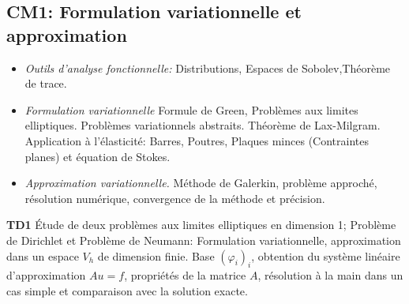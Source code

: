 \documentclass{article}
\begin{document}
\subsection*{CM1: Formulation variationnelle et approximation}
\begin{itemize}[label=\textbullet, font=\small \color{greenESTP}]
\item {\em Outils d'analyse fonctionnelle: } Distributions, Espaces de Sobolev,Théorème de trace.
\item {\em Formulation variationnelle} Formule de Green, Problèmes aux limites elliptiques. Problèmes variationnels abstraits. Théorème de Lax-Milgram. Application à l'élasticité: Barres, Poutres, Plaques minces (Contraintes planes) et équation de Stokes.
\item {\em Approximation variationnelle.} Méthode de Galerkin, problème approché, résolution numérique, convergence de la méthode et précision.
\end{itemize}
{\bf TD1} Étude de deux problèmes aux limites elliptiques en dimension 1; Problème de Dirichlet et Problème de Neumann: Formulation variationnelle, approximation dans un espace $V_h$ de dimension finie. Base $(\varphi_i)_i$, obtention du système linéaire d'approximation $Au=f$, propriétés de la matrice $A$, résolution à la main dans un cas simple et comparaison avec la solution exacte.
\end{document}
